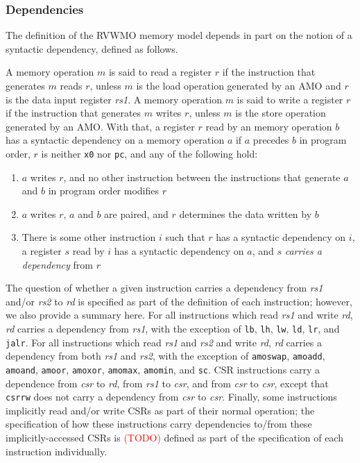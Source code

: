 \subsubsection*{Dependencies}
The definition of the RVWMO memory model depends in part on the notion of a syntactic dependency, defined as follows.

A memory operation $m$ is said to read a register $r$ if the instruction that generates $m$ reads $r$, unless $m$ is the load operation generated by an AMO and $r$ is the data input register {\em rs1}.
A memory operation $m$ is said to write a register $r$ if the instruction that generates $m$ writes $r$, unless $m$ is the store operation generated by an AMO.
With that, a register $r$ read by an memory operation $b$ has a syntactic dependency on a memory operation $a$ if $a$ precedes $b$ in program order, $r$ is neither {\tt x0} nor {\tt pc}, and any of the following hold:
\begin{enumerate}
  \item $a$ writes $r$, and no other instruction between the instructions that generate $a$ and $b$ in program order modifies $r$
  \item $a$ writes $r$, $a$ and $b$ are paired, and $r$ determines the data written by $b$
  \item There is some other instruction $i$ such that $r$ has a syntactic dependency on $i$, a register $s$ read by $i$ has a syntactic dependency on $a$, and $s$ {\em carries a dependency} from $r$
\end{enumerate}

The question of whether a given instruction carries a dependency from {\em rs1} and/or {\em rs2} to {\em rd} is specified as part of the definition of each instruction; however, we also provide a summary here.
For all instructions which read {\em rs1} and write {\em rd}, {\em rd} carries a dependency from {\em rs1}, with the exception of {\tt lb}, {\tt lh}, {\tt lw}, {\tt ld}, {\tt lr}, and {\tt jalr}.
For all instructions which read {\em rs1} and {\em rs2} and write {\em rd}, {\em rd} carries a dependency from both {\em rs1} and {\em rs2}, with the exception of {\tt amoswap}, {\tt amoadd}, {\tt amoand}, {\tt amoor}, {\tt amoxor}, {\tt amomax}, {\tt amomin}, and {\tt sc}.
CSR instructions carry a dependence from {\em csr} to {\em rd}, from {\em rs1} to {\em csr}, and from {\em csr} to {\em csr}, except that {\tt csrrw} does not carry a dependency from {\em csr} to {\em csr}.
Finally, some instructions implicitly read and/or write CSRs as part of their normal operation; the specification of how these instructions carry dependencies to/from these implicitly-accessed CSRs is \textcolor{red}{(TODO)} defined as part of the specification of each instruction individually.

